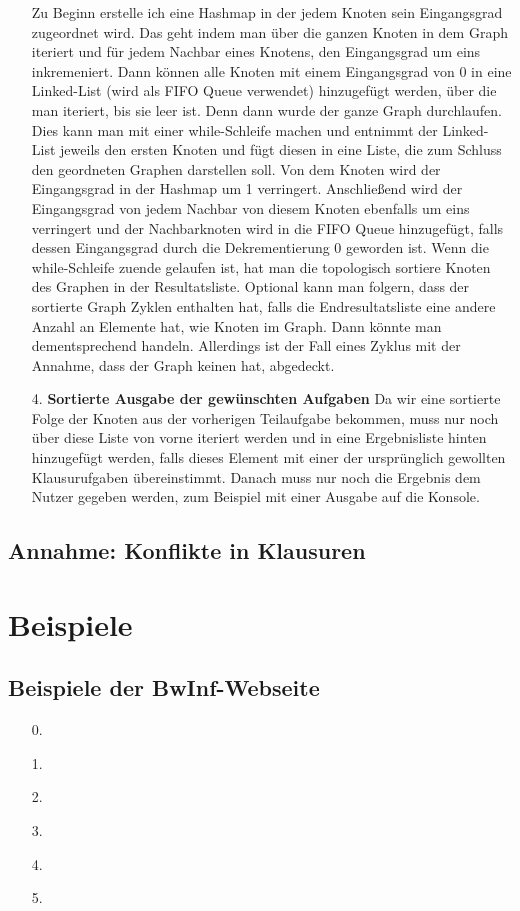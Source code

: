 \documentclass[a4paper,10pt,ngerman]{scrartcl}
\begin{document}
\begin{itemize}
  \newline
  Zu Beginn erstelle ich eine Hashmap in der jedem Knoten sein Eingangsgrad zugeordnet wird. Das geht indem man über die ganzen Knoten in dem Graph iteriert und für jedem Nachbar eines Knotens, den Eingangsgrad um eins inkremeniert.
  Dann können alle Knoten mit einem Eingangsgrad von 0 in eine Linked-List (wird als FIFO Queue verwendet) hinzugefügt werden, über die man iteriert, bis sie leer ist. Denn dann wurde der ganze Graph durchlaufen. 
  Dies kann man mit einer while-Schleife machen und entnimmt der Linked-List jeweils den ersten Knoten und fügt diesen in eine Liste, die zum Schluss den geordneten Graphen darstellen soll. Von dem Knoten wird der 
  Eingangsgrad in der Hashmap um 1 verringert. Anschließend wird der Eingangsgrad von jedem Nachbar von diesem Knoten ebenfalls um eins verringert und der Nachbarknoten wird in die FIFO Queue hinzugefügt, falls dessen Eingangsgrad
  durch die Dekrementierung 0 geworden ist. 
  \newline
  Wenn die while-Schleife zuende gelaufen ist, hat man die topologisch sortiere Knoten des Graphen in der Resultatsliste. Optional kann man folgern, dass der sortierte Graph Zyklen enthalten hat, falls die Endresultatsliste eine andere
  Anzahl an Elemente hat, wie Knoten im Graph. Dann könnte man dementsprechend handeln. Allerdings ist der Fall eines Zyklus mit der Annahme, dass der Graph keinen hat, abgedeckt.
  \item[4.] \textbf{Sortierte Ausgabe der gewünschten Aufgaben}
  Da wir eine sortierte Folge der Knoten aus der vorherigen Teilaufgabe bekommen, muss nur noch über diese Liste von vorne iteriert werden und in eine Ergebnisliste hinten hinzugefügt werden, falls dieses Element mit einer der ursprünglich gewollten Klausurufgaben übereinstimmt.
  Danach muss nur noch die Ergebnis dem Nutzer gegeben werden, zum Beispiel mit einer Ausgabe auf die Konsole.


\end{itemize}
\subsection{Annahme: Konflikte in Klausuren}

\section{Beispiele}
\subsection{Beispiele der BwInf-Webseite}
\begin{itemize}
  \item [0.] 
  \item [1.] 
  \item [2.]
  \item [3.]
  \item [4.]
  \item [5.]
\end{itemize}
\end{document}
